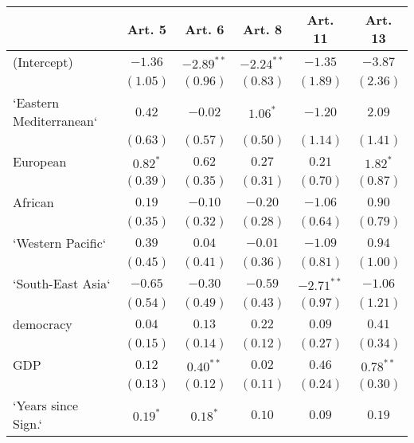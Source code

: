 
\begin{table}[!h]
\begin{center}
\begin{tabular}{l c c c c c }
\toprule
 & Art. 5 & Art. 6 & Art. 8 & Art. 11 & Art. 13 \\
\midrule
(Intercept)             & $-1.36$      & $-2.89^{**}$ & $-2.24^{**}$ & $-1.35$      & $-3.87$      \\
                        & $(1.05)$     & $(0.96)$     & $(0.83)$     & $(1.89)$     & $(2.36)$     \\
`Eastern Mediterranean` & $0.42$       & $-0.02$      & $1.06^{*}$   & $-1.20$      & $2.09$       \\
                        & $(0.63)$     & $(0.57)$     & $(0.50)$     & $(1.14)$     & $(1.41)$     \\
European                & $0.82^{*}$   & $0.62$       & $0.27$       & $0.21$       & $1.82^{*}$   \\
                        & $(0.39)$     & $(0.35)$     & $(0.31)$     & $(0.70)$     & $(0.87)$     \\
African                 & $0.19$       & $-0.10$      & $-0.20$      & $-1.06$      & $0.90$       \\
                        & $(0.35)$     & $(0.32)$     & $(0.28)$     & $(0.64)$     & $(0.79)$     \\
`Western Pacific`       & $0.39$       & $0.04$       & $-0.01$      & $-1.09$      & $0.94$       \\
                        & $(0.45)$     & $(0.41)$     & $(0.36)$     & $(0.81)$     & $(1.00)$     \\
`South-East Asia`       & $-0.65$      & $-0.30$      & $-0.59$      & $-2.71^{**}$ & $-1.06$      \\
                        & $(0.54)$     & $(0.49)$     & $(0.43)$     & $(0.97)$     & $(1.21)$     \\
democracy               & $0.04$       & $0.13$       & $0.22$       & $0.09$       & $0.41$       \\
                        & $(0.15)$     & $(0.14)$     & $(0.12)$     & $(0.27)$     & $(0.34)$     \\
GDP                     & $0.12$       & $0.40^{**}$  & $0.02$       & $0.46$       & $0.78^{**}$  \\
                        & $(0.13)$     & $(0.12)$     & $(0.11)$     & $(0.24)$     & $(0.30)$     \\
`Years since Sign.`     & $0.19^{*}$   & $0.18^{*}$   & $0.10$       & $0.09$       & $0.19$       \\

\end{tabular}
\end{center}
\end{table}
